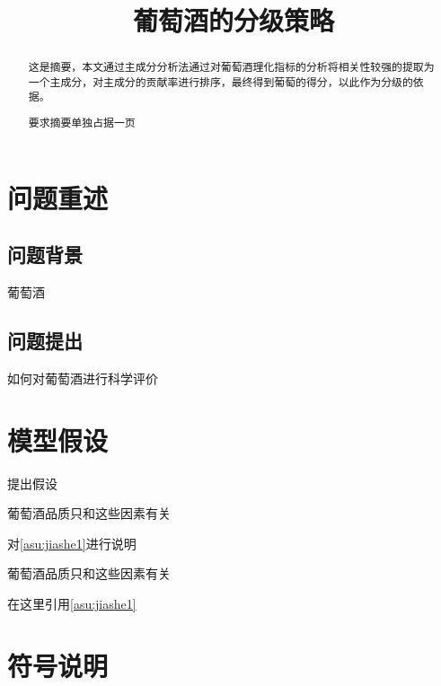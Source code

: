 \documentclass{cumcmthesis}
\title{葡萄酒的分级策略}
\begin{document}
	 \maketitle
	\begin{abstract}
		这是摘要，本文通过主成分分析法通过对葡萄酒理化指标的分析将相关性较强的提取为一个主成分，对主成分的贡献率进行排序，最终得到葡萄的得分，以此作为分级的依据。
		
		
		
		\vspace*{2\baselineskip}   %
		要求摘要单独占据一页 
		
	\end{abstract}

	\section{问题重述}
	\subsection{问题背景}
	葡萄酒
	\subsection{问题提出}
	如何对葡萄酒进行科学评价
	
	\section{模型假设}
	提出假设
	\begin{assumption}
		葡萄酒品质只和这些因素有关
		\label{asu:jiashe1}
	\end{assumption}
\par
对\cref{asu:jiashe1}进行说明

	\begin{assumption}
	葡萄酒品质只和这些因素有关
	\label{asu:jiashe2}
	\end{assumption}
\par
	在这里引用\cref{asu:jiashe1}
	
	
	\section{符号说明}
	
\end{document}
